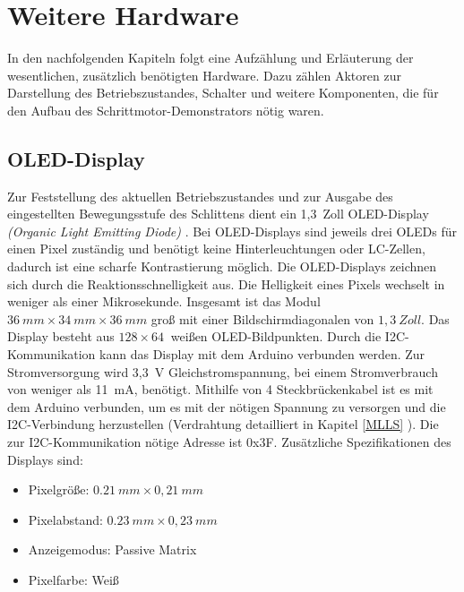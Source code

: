
\chapter{Weitere Hardware}
In den nachfolgenden Kapiteln folgt eine Aufzählung und Erläuterung der wesentlichen, zusätzlich benötigten Hardware. Dazu zählen Aktoren zur Darstellung des Betriebszustandes, Schalter und weitere Komponenten, die für den Aufbau des Schrittmotor-Demonstrators nötig waren.  

\section{OLED-Display}
Zur Feststellung des aktuellen Betriebszustandes und zur Ausgabe des eingestellten Bewegungsstufe des Schlittens dient ein 1,3\ Zoll OLED-Display \emph{(Organic Light Emitting Diode)} . Bei OLED-Displays sind jeweils drei OLEDs für einen Pixel zuständig und benötigt keine Hinterleuchtungen oder LC-Zellen, dadurch ist eine scharfe Kontrastierung möglich. Die OLED-Displays zeichnen sich durch die Reaktionsschnelligkeit aus. Die Helligkeit eines Pixels wechselt in weniger als einer Mikrosekunde.\cite{DieterStotz.2019} Insgesamt ist das Modul $36 \ mm \times 34  \ mm \times36 \ mm$ groß mit einer Bildschirmdiagonalen von $1,3\ Zoll $. Das Display besteht aus $128 \times 64 \ $ weißen OLED-Bildpunkten. Durch die I2C-Kommunikation kann das Display mit dem Arduino verbunden werden. Zur Stromversorgung wird  3,3\ V Gleichstromspannung, bei einem Stromverbrauch von weniger als 11\ mA, benötigt. Mithilfe von 4 Steckbrückenkabel ist es mit dem Arduino verbunden, um es mit der nötigen Spannung zu versorgen und die I2C-Verbindung herzustellen (Verdrahtung detailliert in Kapitel \ref{MLLS} ). Die zur I2C-Kommunikation nötige Adresse ist 0x3F. %
Zusätzliche Spezifikationen des Displays sind: 
	\begin{itemize}
		\item Pixelgröße: $0.21 \ mm \times 0,21 \ mm $
		\item Pixelabstand: $0.23 \ mm \times 0,23 \ mm $
		\item Anzeigemodus: Passive Matrix
		\item Pixelfarbe: Weiß
	\end{itemize}
\cite{AZDelivery.24}


